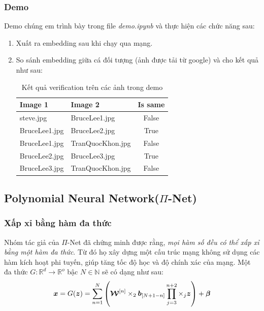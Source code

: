 \documentclass[a4paper, 12pt]{article}
\begin{document}
\subsubsection{Demo}
Demo chúng em trình bày trong file \textit{demo.ipynb} và thực hiện các chức năng sau: 
\begin{enumerate}
    \item Xuất ra embedding sau khi chạy qua mạng. 
    \item So sánh embedding giữa cá đối tượng (ảnh được tải từ google) và cho kết quả như sau:  
    \begin{table}[H]
        \centering
        \begin{tabular}{|l|l|c|}
        \hline 
        Image 1 & Image 2 & Is same\\ \hline 
        steve.jpg & BruceLee1.jpg & False\\ \hline 
        BruceLee1.jpg & BruceLee2.jpg & True\\ \hline
        BruceLee1.jpg & TranQuocKhon.jpg & False\\ \hline 
        BruceLee2.jpg & BruceLee3.jpg & True\\ \hline
        BruceLee3.jpg & TranQuocKhon.jpg & False\\ \hline 
        \end{tabular}
        \caption{Kết quả verification trên các ảnh trong demo}
    \end{table}
\end{enumerate}

\subsection{Polynomial Neural Network($\Pi$-Net)}
\subsubsection{Xấp xỉ bằng hàm đa thức}
Nhóm tác giả của $\Pi$-Net đã chứng minh được rằng, \textit{mọi hàm số đều có thể xấp xỉ bằng một hàm đa thức}. Từ đó họ xây dựng một cấu trúc mạng không sử dụng các hàm kích hoạt phi tuyến, giúp tăng tốc độ học và độ chính xác của mạng. Một đa thức $G:\mathbb{R}^d \to \mathbb{R}^o$ bậc $N \in \mathbb{N}$ sẽ có dạng như sau:
\begin{equation}
\vb*{x} = G(\vb*{z}) = \sum_{n=1}^{N}{\left(\vb*{\mathcal{W}}^{[n]} \times_2 \vb*{b}_{[N+1-n]}\prod_{j=3}^{n+2}\times_j \vb*{z}\right)} + \vb*{\beta}
\end{equation}
\end{document}
